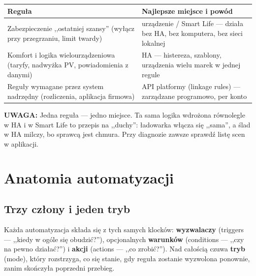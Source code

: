 \documentclass[11pt,a4paper]{article}
\newcommand{\uwaga}[1]{\par\medskip\noindent\textcolor{warnred}{\textbf{UWAGA:}} #1\par\medskip}
\begin{document}
\begin{center}
\begin{tabular}{>{\raggedright\arraybackslash}p{6.6cm} >{\raggedright\arraybackslash}p{7.4cm}}
\toprule
\textbf{Reguła} & \textbf{Najlepsze miejsce i powód}\\
\midrule
Zabezpieczenie ,,ostatniej szansy'' (wyłącz przy przegrzaniu, limit twardy) & urządzenie / Smart Life --- działa bez HA, bez komputera, bez sieci lokalnej\\
\addlinespace
Komfort i logika wielourządzeniowa (taryfy, nadwyżka PV, powiadomienia z danymi) & HA --- histereza, szablony, urządzenia wielu marek w jednej regule\\
\addlinespace
Reguły wymagane przez system nadrzędny (rozliczenia, aplikacja firmowa) & API platformy (linkage rules) --- zarządzane programowo, per konto\\
\bottomrule
\end{tabular}
\end{center}

\uwaga{Jedna reguła --- jedno miejsce. Ta sama logika wdrożona równolegle w HA i w Smart Life to przepis na ,,duchy'': ładowarka włącza się ,,sama'', a ślad w HA milczy, bo sprawcą jest chmura. Przy diagnozie zawsze sprawdź listę scen w aplikacji.}

\section{Anatomia automatyzacji}
\label{sec:anatomia}

\subsection{Trzy człony i jeden tryb}

Każda automatyzacja składa się z tych samych klocków: \textbf{wyzwalaczy} (triggers --- ,,kiedy w ogóle się obudzić?''), opcjonalnych \textbf{warunków} (conditions --- ,,czy na pewno działać?'') i \textbf{akcji} (actions --- ,,co zrobić?''). Nad całością czuwa \textbf{tryb} (mode), który rozstrzyga, co się stanie, gdy reguła zostanie wyzwolona ponownie, zanim skończyła poprzedni przebieg.
\end{document}
